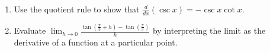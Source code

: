 \documentclass[12pt]{article}
\newif\ifans
\begin{document}
\begin{enumerate}
\ifans{\fbox{\parbox{0.5\linewidth}{
\begin{align*}
\frac{d}{dx}(\cot{x})&=\frac{d}{dx}\left(\frac{\cos{x}}{\sin{x}}\right)\\
&=\frac{(\sin{x})(-\sin{x})-(\cos{x})(\cos{x})}{\sin^2{x}}\\
&=\frac{-(\sin^2{x}+\cos^2{x})}{\sin^2{x}}\\
&=-\frac{1}{\sin^2{x}}\\
&=-\csc^2{x}
\end{align*}
}}} \fi
\item Use the quotient rule to show that $\frac{d}{dx}(\csc{x})=-\csc{x}\cot{x}$.

\ifans{\fbox{\parbox{0.5\linewidth}{
\begin{align*}
\frac{d}{dx}(\csc{x})&=\frac{d}{dx}\left(\frac{1}{\sin{x}}\right)\\
&=\frac{(\sin{x})(0)-(1)(\cos{x})}{\sin^2{x}}\\
&=-\frac{\cos{x}}{\sin^2{x}}\\
&=-\frac{1}{\sin{x}}\frac{\cos{x}}{\sin{x}}\\
&=-\csc{x}\cot{x}
\end{align*}
}}} \fi

\newpage

\item Evaluate $\lim_{h \rightarrow 0}{\frac{\tan{\left(\frac{\pi}{3}+h\right)}-\tan{\left(\frac{\pi}{3}\right)}}{h}}$ by interpreting the limit as the derivative of a function at a particular point.

\ifans{\fbox{$\lim_{h \rightarrow 0}{\frac{\tan{\left(\frac{\pi}{3}+h\right)}-\tan{\left(\frac{\pi}{3}\right)}}{h}}=\left.\frac{d}{dx}(\tan{x})\right|_{x=\frac{\pi}{3}}=\sec^2{\left(\frac{\pi}{3}\right)}=4$}} \fi

\end{enumerate}

\end{document}
